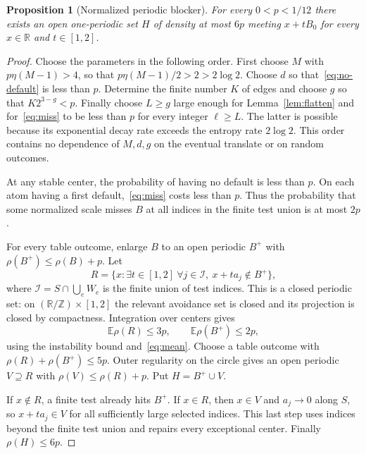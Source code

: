 \documentclass[11pt]{article}
\newtheorem{proposition}[theorem]{Proposition}
\theoremstyle{remark}\newtheorem{remark}[theorem]{Remark}
\newcommand{\R}{\mathbb R}\newcommand{\N}{\mathbb N}
\newcommand{\Z}{\mathbb Z}\newcommand{\Prob}{\mathbb P}
\newcommand{\E}{\mathbb E}\newcommand{\ind}{\mathbf 1}
\begin{document}
\begin{proposition}[Normalized periodic blocker]\label{prop:normalized}
For every $0<p<1/12$ there exists an open one-periodic set $H$ of density at most $6p$ meeting $x+tB_0$ for every $x\in\R$ and $t\in[1,2]$.
\end{proposition}
\begin{proof}
Choose the parameters in the following order. First choose $M$ with $p\eta(M-1)>4$, so that $p\eta(M-1)/2>2>2\log2$. Choose $d$ so that~\eqref{eq:no-default} is less than $p$. Determine the finite number $K$ of edges and choose $g$ so that $K2^{3-g}<p$. Finally choose $L\ge g$ large enough for Lemma~\ref{lem:flatten} and for~\eqref{eq:miss} to be less than $p$ for every integer $\ell\ge L$. The latter is possible because its exponential decay rate exceeds the entropy rate $2\log2$. This order contains no dependence of $M,d,g$ on the eventual translate or on random outcomes.

At any stable center, the probability of having no default is less than $p$. On each atom having a first default,~\eqref{eq:miss} costs less than $p$. Thus the probability that some normalized scale misses $B$ at all indices in the finite test union is at most $2p$.

For every table outcome, enlarge $B$ to an open periodic $B^+$ with $\rho(B^+)\le\rho(B)+p$. Let
\[
 R=\{x:\exists t\in[1,2]\ \forall j\in\mathcal I,
                      \ x+t a_j\notin B^+\},
\]
where $\mathcal I=S\cap\bigcup_e W_e$ is the finite union of test indices. This is a closed periodic set: on $(\R/\Z)\times[1,2]$ the relevant avoidance set is closed and its projection is closed by compactness. Integration over centers gives
\[
 \E\rho(R)\le3p,\qquad \E\rho(B^+)\le2p,
\]
using the instability bound and~\eqref{eq:mean}. Choose a table outcome with $\rho(R)+\rho(B^+)\le5p$. Outer regularity on the circle gives an open periodic $V\supseteq R$ with $\rho(V)\le\rho(R)+p$. Put $H=B^+\cup V$.

If $x\notin R$, a finite test already hits $B^+$. If $x\in R$, then $x\in V$ and $a_j\to0$ along $S$, so $x+t a_j\in V$ for all sufficiently large selected indices. This last step uses indices beyond the finite test union and repairs every exceptional center. Finally $\rho(H)\le6p$.
\end{proof}
\end{document}
